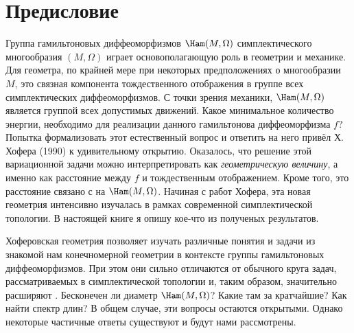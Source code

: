\chapter*{Предисловие}

Группа гамильтоновых диффеоморфизмов $\Ham(M,\Omega)$ симплектического
многообразия $(M,\Omega)$ играет
основополагающую роль в геометрии и
механике.  Для геометра, по крайней мере при некоторых предположениях
о многообразии $M$, это связная компонента тождественного отображения
в группе всех симплектических диффеоморфизмов.  С точки зрения
механики, $\Ham(M,\Omega)$ является группой всех допустимых движений.
Какое минимальное количество энергии, необходимо для реализации
данного гамильтонова диффеоморфизма $f$?  Попытка формализовать этот
естественный вопрос и ответить на него привёл Х. Хофера \cite{H1}
(1990) к удивительному открытию.  Оказалось, что решение этой
вариационной задачи можно интерпретировать как \emph{геометрическую
  величину}, а именно как расстояние между $f$ и тождественным
отображением.  Кроме того, это расстояние связано с  на $\Ham(M,\Omega)$.  Начиная с работ
Хофера, эта новая геометрия интенсивно изучалась в рамках современной
симплектической топологии.  В настоящей книге я опишу кое-что из
полученых результатов.

Хоферовская геометрия позволяет изучать различные понятия и задачи из знакомой нам конечномерной геометрии в контексте группы гамильтоновых диффеоморфизмов.
При этом они сильно отличаются от обычного круга задач, рассматриваемых в симплектической топологии и, таким образом, значительно расширяют .
Бесконечен ли диаметр $\Ham(M,\Omega)$?
Какие там за кратчайшие?
Как найти спектр длин?
В общем случае, эти вопросы остаются открытыми.
Однако некоторые частичные ответы существуют и будут нами рассмотрены.

